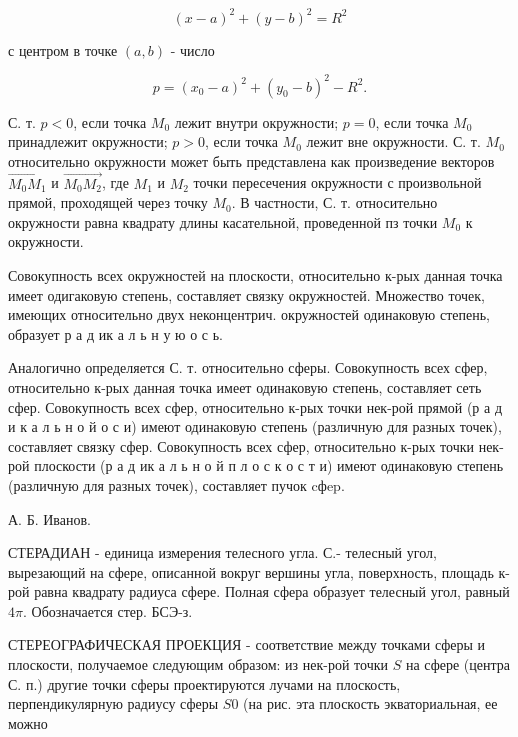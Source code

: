 \documentclass[10pt]{article}
\begin{document}
\[

(x-a)^{2}+(y-b)^{2}=R^{2}

\]



с центром в точке $(a, b)$ - число



\[

p=\left(x_{0}-a\right)^{2}+\left(y_{0}-b\right)^{2}-R^{2} .

\]



С. т. $p<0$, если точка $M_{0}$ лежит внутри окружности; $p=0$, если точка $M_{0}$ принадлежит окружности; $p>0$, если точка $M_{0}$ лежит вне окружности. С. т. $M_{0}$ относительно окружности может быть представлена как произведение векторов $\overrightarrow{M_{0} M_{1}}$ и $\overrightarrow{M_{0} M_{2}}$, где $M_{1}$ и $M_{2}$ точки пересечения окружности с произвольной прямой, проходящей через точку $M_{0}$. В частности, С. т. относительно окружности равна квадрату длины касательной, проведенной пз точки $M_{0}$ к окружности.



Совокупность всех окружностей на плоскости, относительно к-рых данная точка имеет одигаковую степень, составляет связку окружностей. Множество точек, имеющих относительно двух неконцентрич. окружностей одинаковую степень, образует р а д ик а л ь н у ю о с ь.



Аналогично определяется С. т. относительно сферы. Совокупность всех сфер, относительно к-рых данная точка имеет одинаковую степень, составляет сеть сфер. Совокупность всех сфер, относительно к-рых точки нек-рой прямой (р а д и к а л ь н о й о с и) имеют одинаковую степень (различную для разных точек), составляет связку сфер. Совокупность всех сфер, относительно к-рых точки нек-рой плоскости (р а д ик а л ь н о й п л о с к о с т и) имеют одинаковую степень (различную для разных точек), составляет пучок cфep.



А. Б. Иванов.



СТЕРАДИАН - единица измерения телесного угла. С.- телесный угол, вырезающий на сфере, описанной вокруг вершины угла, поверхность, площадь к-рой равна квадрату радиуса сфере. Полная сфера образует телесный угол, равный $4 \pi$. Обозначается стер. БСЭ-з.



СТЕРЕОГРАФИЧЕСКАЯ ПРОЕКЦИЯ - соответствие между точками сферы и плоскости, получаемое следующим образом: из нек-рой точки $S$ на сфере (центра С. п.) другие точки сферы проектируются лучами на плоскость, перпендикулярную радиусу сферы $S 0$ (на рис. эта плоскость экваториальная, ее можно
\end{document}
